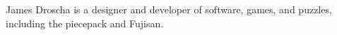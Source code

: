 \documentclass[journal]{IEEEtran}
\begin{document}
\begin{IEEEbiography}{James Droscha}
is a designer and developer of software, games, and puzzles, including the piecepack and Fujisan.
\end{IEEEbiography}



\vfill




\end{document}

